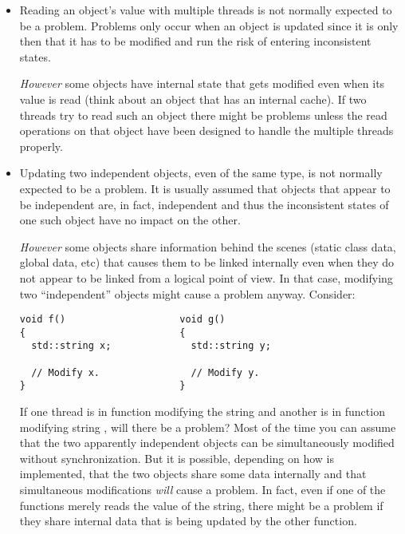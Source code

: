 \begin{itemize}
  
\item Reading an object's value with multiple threads is not normally expected to be a problem.
  Problems only occur when an object is updated since it is only then that it has to be modified
  and run the risk of entering inconsistent states.
  
  \emph{However} some objects have internal state that gets modified even when its value is read
  (think about an object that has an internal cache). If two threads try to read such an object
  there might be problems unless the read operations on that object have been designed to handle
  the multiple threads properly.
  
\item Updating two independent objects, even of the same type, is not normally expected to be a
  problem. It is usually assumed that objects that appear to be independent are, in fact,
  independent and thus the inconsistent states of one such object have no impact on the other.
  
  \emph{However} some objects share information behind the scenes (static class data, global
  data, etc) that causes them to be linked internally even when they do not appear to be linked
  from a logical point of view. In that case, modifying two ``independent'' objects might cause
  a problem anyway. Consider:

\begin{lstlisting}
void f()                    void g()
{                           {
  std::string x;              std::string y;

  // Modify x.                // Modify y.
}                           }
\end{lstlisting}
  
If one thread is in function  modifying the string  and another is in
function  modifying string , will there be a problem? Most of the time
you can assume that the two apparently independent objects can be simultaneously modified
without synchronization. But it is possible, depending on how  is
implemented, that the two objects share some data internally and that simultaneous modifications
\emph{will} cause a problem. In fact, even if one of the functions merely reads the value of the
string, there might be a problem if they share internal data that is being updated by the other
function.
  

\end{itemize}

